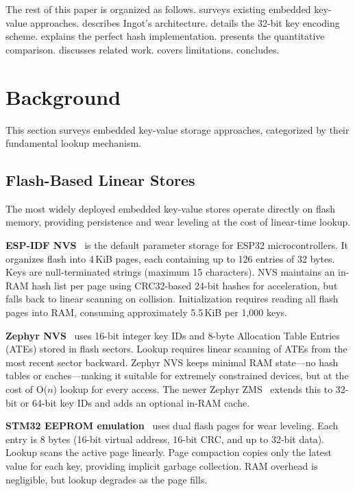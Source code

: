 \documentclass[10pt,twocolumn,letterpaper]{article}
\begin{document}
The rest of this paper is organized as follows.
 surveys existing embedded key-value approaches.
 describes Ingot's architecture.
 details the 32-bit key encoding scheme.
 explains the perfect hash implementation.
 presents the quantitative comparison.
 discusses related work.
 covers limitations.
 concludes.

\section{Background}
\label{sec:background}

This section surveys embedded key-value storage approaches,
categorized by their fundamental lookup mechanism.

\subsection{Flash-Based Linear Stores}

The most widely deployed embedded key-value stores operate directly
on flash memory, providing persistence and wear leveling at the cost
of linear-time lookup.

\textbf{ESP-IDF NVS}~\cite{esp-nvs} is the default parameter storage
for ESP32 microcontrollers.  It organizes flash into 4\,KiB pages,
each containing up to 126 entries of 32 bytes.  Keys are
null-terminated strings (maximum 15 characters).  NVS maintains an
in-RAM hash list per page using CRC32-based 24-bit hashes for
acceleration, but falls back to linear scanning on collision.
Initialization requires reading all flash pages into RAM, consuming
approximately 5.5\,KiB per 1,000 keys.

\textbf{Zephyr NVS}~\cite{zephyr-nvs} uses 16-bit integer key IDs
and 8-byte Allocation Table Entries (ATEs) stored in flash sectors.
Lookup requires linear scanning of ATEs from the most recent sector
backward.  Zephyr NVS keeps minimal RAM state---no hash tables or
caches---making it suitable for extremely constrained devices, but at
the cost of O($n$) lookup for every access.  The newer Zephyr
ZMS~\cite{zephyr-zms} extends this to 32-bit or 64-bit key IDs and
adds an optional in-RAM cache.

\textbf{STM32 EEPROM emulation}~\cite{stm32-eeprom} uses dual flash
pages for wear leveling.  Each entry is 8 bytes (16-bit virtual
address, 16-bit CRC, and up to 32-bit data).  Lookup scans the active
page linearly.  Page compaction copies only the latest value for each
key, providing implicit garbage collection.  RAM overhead is
negligible, but lookup degrades as the page fills.
\end{document}
